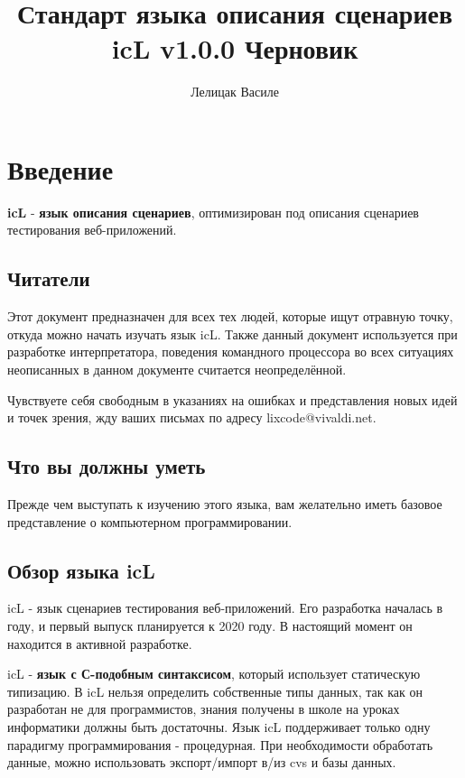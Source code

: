 \documentclass[a4paper, 14pt]{extarticle}
\begin{document}
\title{Стандарт языка описания сценариев icL v1.0.0 Черновик}
\author{Лелицак Василе}

\maketitle

\newpage
\renewcommand{\contentsname}{\textsf{Оглавление}}
\tableofcontents


\section{Введение}

\indent \textbf{icL} - \textbf{язык описания сценариев}, оптимизирован под описания сценариев тестирования веб-приложений.

\subsection{Читатели}

Этот документ предназначен для всех тех людей, которые ищут отравную точку, откуда можно начать изучать язык icL. Также данный документ используется при разработке интерпретатора, поведения командного процессора во всех ситуациях неописанных в данном документе считается неопределённой.

Чувствуете себя свободным в указаниях на ошибках и представления новых идей и точек зрения, жду ваших письмах по адресу lixcode@vivaldi.net.

\subsection{Что вы должны уметь}

Прежде чем выступать к изучению этого языка, вам желательно иметь базовое представление о компьютерном программировании.

\subsection{Обзор языка icL}

icL - язык сценариев тестирования веб-приложений. Его разработка началась в году, и первый выпуск планируется к 2020 году. В настоящий момент он находится в активной разработке.

icL - \textbf{язык с С-подобным синтаксисом}, который использует статическую типизацию. В icL нельзя определить собственные типы данных, так как он разработан не для программистов, знания получены в школе на уроках информатики должны быть достаточны. Язык icL поддерживает только одну парадигму программирования - процедурная. При необходимости обработать данные, можно использовать экспорт/импорт в/из cvs и базы данных.
\end{document}
